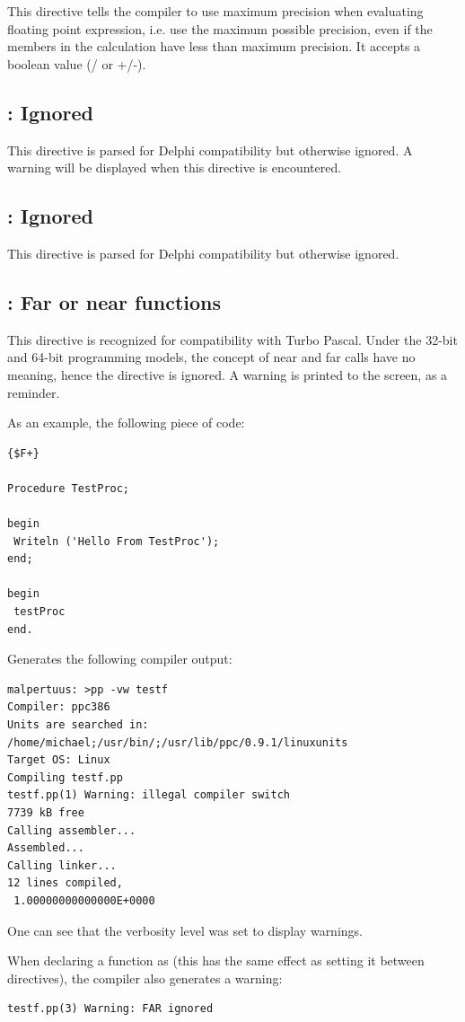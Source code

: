This directive tells the compiler to use maximum precision when evaluating
floating point expression, i.e. use the maximum possible precision, even if
the members in the calculation have less than maximum precision. 
It accepts a boolean value (/ or +/-). 

\subsection{: Ignored}
This directive is parsed for Delphi compatibility but otherwise ignored. A
warning will be displayed when this directive is encountered.

\subsection{: Ignored}
This directive is parsed for Delphi compatibility but otherwise ignored. 

\subsection{ : Far or near functions}
This directive is recognized for compatibility with Turbo Pascal. Under the
32-bit and 64-bit programming models, the concept of near and far calls have
no meaning, hence the directive is ignored. A warning is printed to the screen, 
as a reminder.

As an example, the following piece of code:
\begin{verbatim}
{$F+}

Procedure TestProc;

begin
 Writeln ('Hello From TestProc');
end;

begin
 testProc
end.
\end{verbatim}
Generates the following compiler output:
\begin{verbatim}
malpertuus: >pp -vw testf
Compiler: ppc386
Units are searched in: /home/michael;/usr/bin/;/usr/lib/ppc/0.9.1/linuxunits
Target OS: Linux
Compiling testf.pp
testf.pp(1) Warning: illegal compiler switch
7739 kB free
Calling assembler...
Assembled...
Calling linker...
12 lines compiled,
 1.00000000000000E+0000
\end{verbatim}
One can see that the verbosity level was set to display warnings.

When declaring a function as  (this has the same effect as setting it
between  directives), the compiler also generates a
warning:
\begin{verbatim}
testf.pp(3) Warning: FAR ignored
\end{verbatim}

